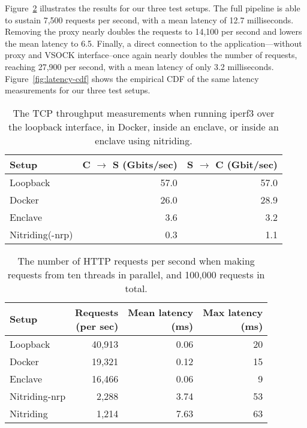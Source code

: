Figure~\ref{fig:latency-msmts} illustrates the results for our three test
setups.  The full pipeline is able to sustain 7,500 requests per second, with a
mean latency of 12.7 milliseconds.  Removing the proxy nearly doubles the
requests to 14,100 per second and lowers the mean latency to 6.5.  Finally, a
direct connection to the application---without proxy and VSOCK interface--once
again nearly doubles the number of requests, reaching 27,900 per second, with a
mean latency of only 3.2 milliseconds.  Figure~\ref{fig:latency-cdf} shows the
empirical CDF of the same latency measurements for our three test setups.

\begin{table}[t]
    \centering
    \begin{tabular}{l r r}
    \toprule
      Setup & C $\rightarrow$ S (Gbits/sec) & S $\rightarrow$ C (Gbit/sec) \\
    \midrule
      Loopback        & 57.0 & 57.0 \\
      Docker          & 26.0 & 28.9 \\
      Enclave         &  3.6 &  3.2 \\
      Nitriding(-nrp) &  0.3 &  1.1 \\
    \bottomrule
    \end{tabular}
    \caption{The TCP throughput measurements when running iperf3 over the
    loopback interface, in Docker, inside an enclave, or inside an enclave using
    nitriding.}%
    \label{fig:iperf3}
\end{table}

\begin{table}[t]
    \centering
    \begin{tabular}{l r r r}
    \toprule
      Setup & \makecell[r]{Requests\\(per sec)} &
              \makecell[r]{Mean latency\\(ms)} &
              \makecell[r]{Max latency\\(ms)} \\
    \midrule
      Loopback      & 40,913 &  0.06 & 20 \\
      Docker        & 19,321 &  0.12 & 15 \\
      Enclave       & 16,466 &  0.06 &  9 \\
      Nitriding-nrp &  2,288 &  3.74 & 53 \\
      Nitriding     &  1,214 &  7.63 & 63 \\
    \bottomrule
    \end{tabular}
    \caption{The number of HTTP requests per second when making requests from
    ten threads in parallel, and 100,000 requests in total.}%
    \label{fig:latency-msmts}
\end{table}

